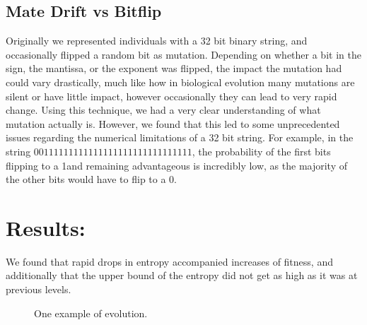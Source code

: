 \documentclass[11pt]{article}
\begin{document}
\subsection{Mate Drift vs Bitflip}
Originally we represented individuals with a 32 bit binary string, and occasionally 
flipped a random bit as mutation. Depending on whether a bit in the sign, the mantissa, 
or the exponent was flipped, the impact the mutation had could vary drastically,
much like how in biological evolution many mutations are silent or have little impact,
 however occasionally  they can lead to very rapid change. Using this technique,
 we had a very clear understanding of what mutation actually is. However, we found 
that this led to some unprecedented issues regarding the numerical limitations
of a 32 bit string. For example, in the string $0 01111111 11111111111111111111111$,
the probability of the first bits flipping to a 1and remaining advantageous is incredibly
low, as the majority of the other bits would have to flip to a 0.

\section{Results:}
\label{sec:orged0917a}
We found that rapid drops in entropy accompanied increases of fitness, and
additionally that the upper bound of the entropy did not get as high
as it was at previous levels.


\begin{figure}
  \centering{}
  \caption{One example of evolution.}
  \label{fig:multi-step}
\end{figure}
\end{document}
